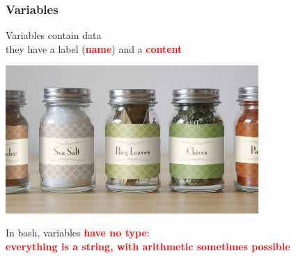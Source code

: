 \documentclass[unknownkeysallowed, 10pt, a4 paper, handout]{beamer}
\newcommand{\focus}[1]{\textbf{\textcolor{red}{#1}}}
\begin{document}
\begin{frame}
  \begin{center}
    \frametitle{Variables}

    Variables contain data\\
    they have a label (\focus{name}) and a \focus{content}

    \begin{center}
      \includegraphics[width=0.72\textwidth]{pics/jars.jpg}
    \end{center}

    In bash, variables \focus{have no type}:\\
    \focus{everything is a string, with arithmetic sometimes possible}
  \end{center}
\end{frame}
\end{document}
